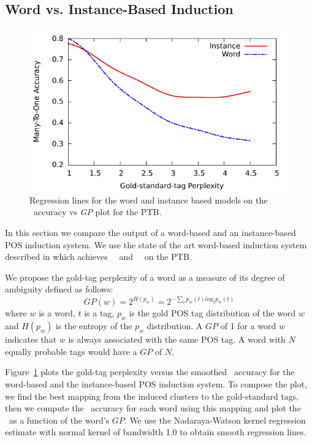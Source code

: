 \subsection{Word vs. Instance-Based Induction}
\label{sec:typevsinstance}

\begin{figure}[h] \centering
  \includegraphics[width=\columnwidth]{ksmooth-f.pdf} 
  \caption{Regression lines for the word and instance based models on the \mto\
    accuracy vs {\em GP} plot for the PTB.} 
  \label{fig:perplexity}
\end{figure}

In this section we compare the output of a word-based and an
instance-based POS induction system.  We use the state of the art
word-based induction system described in
\cite{yatbaz-sert-yuret:2012:EMNLP-CoNLL} which achieves
\ftmto\ \mto\ and \ftvm\ \vm\ on the PTB.

We propose the gold-tag perplexity of a word as a measure of its
degree of ambiguity defined as follows:
\begin{equation*} \label{eq:tag-perp}
GP(w) = 2^{H(p_w)} = 2^{-\sum_{t} p_w(t)log_2 p_w(t)}
\end{equation*}
\noindent where $w$ is a word, $t$ is a tag, $p_w$ is the gold POS tag
distribution of the word $w$ and $H(p_w)$ is the entropy of the $p_w$
distribution.  A $GP$ of 1 for a word $w$ indicates that $w$ is always
associated with the same POS tag.  A word with $N$ equally probable
tags would have a $GP$ of $N$.

Figure~\ref{fig:perplexity} plots the gold-tag perplexity versus the
smoothed \mto\ accuracy for the word-based and the instance-based POS
induction system.  To compose the plot, we find the best mapping from
the induced clusters to the gold-standard tags, then we compute the
\mto\ accuracy for each word using this mapping and plot the \mto\ as
a function of the word's $GP$.  We use the Nadaraya-Watson kernel
regression estimate \cite{nadaraya1964estimating,watson1964smooth}
with normal kernel of bandwidth 1.0 to obtain smooth regression lines.

